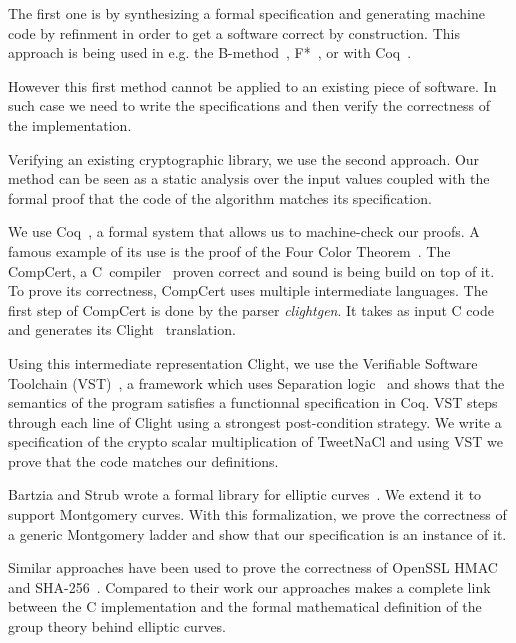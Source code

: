 The first one is by synthesizing a formal specification and generating machine
code by refinment in order to get a software correct by construction.
This approach is being used in e.g. the B-method~\cite{Abrial:1996:BAP:236705},
F*~\cite{DBLP:journals/corr/BhargavanDFHPRR17}, or with Coq~\cite{CpdtJFR}.

However this first method cannot be applied to an existing piece of software.
In such case we need to write the specifications and then verify the correctness
of the implementation.

Verifying an existing cryptographic library, we use the second approach.
Our method can be seen as a static analysis over the input values coupled
with the formal proof that the code of the algorithm matches its specification.

We use Coq~\cite{coq-faq}, a formal system that allows us to machine-check our proofs.
A famous example of its use is the proof of the Four Color Theorem~\cite{gonthier2008formal}.
The CompCert, a C~compiler~\cite{Leroy-backend} proven correct and sound is being build on top of it.
To prove its correctness, CompCert uses multiple intermediate languages. The first step of CompCert is done by the parser \textit{clightgen}.
It takes as input C code and generates its Clight~\cite{Blazy-Leroy-Clight-09} translation.

Using this intermediate representation Clight, we use the Verifiable Software Toolchain
(VST)~\cite{2012-Appel}, a framework which uses Separation logic~\cite{1969-Hoare,Reynolds02separationlogic}
and shows that the semantics of the program satisfies a functionnal specification in Coq.
VST steps through each line of Clight using a strongest post-condition strategy.
We write a specification of the crypto scalar multiplication of TweetNaCl and using
VST we prove that the code matches our definitions.

Bartzia and Strub wrote a formal library for elliptic curves~\cite{DBLP:conf/itp/BartziaS14}.
We extend it to support Montgomery curves. With this formalization, we prove the
correctness of a generic Montgomery ladder and show that our specification is an instance of it.



Similar approaches have been used to prove the correctness of OpenSSL HMAC~\cite{Beringer2015VerifiedCA}
and SHA-256~\cite{2015-Appel}. Compared to their work
our approaches makes a complete link between the C implementation and the formal
mathematical definition of the group theory behind elliptic curves.

